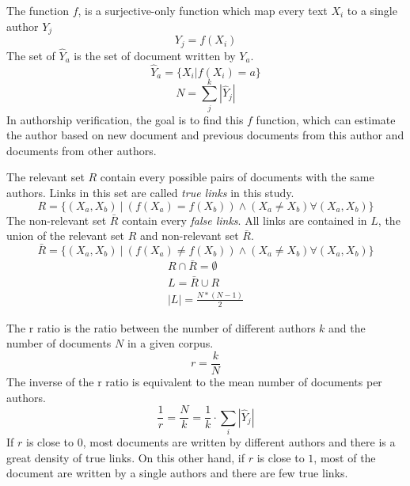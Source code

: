 \begin{definition}
  The function $f$, is a surjective-only function which map every text $X_i$ to a single author $Y_j$
  \begin{equation}
    Y_j = f(X_i)
  \end{equation}
  The set of $\hat{Y}_a$ is the set of document written by $Y_a$.
  \begin{equation}
    \hat{Y}_a = \{X_i | f(X_i) = a\}
  \end{equation}
  \begin{equation}
    N = \sum_{j}^k |\hat{Y}_j|
  \end{equation}
  In authorship verification, the goal is to find this $f$ function, which can estimate the author based on new document and previous documents from this author and documents from other authors.
\end{definition}

\begin{definition}
  The relevant set $R$ contain every possible pairs of documents with the same authors.
  Links in this set are called \textit{true links} in this study.
  \begin{equation}
    R = \{(X_a, X_b)\ |\ \left( f(X_a) = f(X_b) \right) \land \left(X_a \neq X_b \right) \forall (X_a, X_b)\}
  \end{equation}
  The non-relevant set $\bar{R}$ contain every \textit{false links}.
  All links are contained in $L$, the union of the relevant set $R$ and non-relevant set $\bar{R}$.
  \begin{equation}
    \bar{R} = \{(X_a, X_b)\ |\ \left( f(X_a) \neq f(X_b) \right) \land \left(X_a \neq X_b \right) \forall (X_a, X_b)\}
  \end{equation}
  \begin{gather}
    R \cap \bar{R} = \emptyset \\
    L = \bar{R} \cup R \\
    |L| = \frac{N * (N-1)}{2}
  \end{gather}
\end{definition}

\begin{definition}
  The r ratio is the ratio between the number of different authors $k$ and the number of documents $N$ in a given corpus.
  \begin{equation}
    r = \frac{k}{N}
  \end{equation}
  The inverse of the r ratio is equivalent to the mean number of documents per authors.
  \begin{equation}
    \frac{1}{r} = \frac{N}{k} = \frac{1}{k} \cdot \sum_{i} |\hat{Y}_j|
  \end{equation}
  If $r$ is close to $0$, most documents are written by different authors and there is a great density of true links.
  On this other hand, if $r$ is close to $1$, most of the document are written by a single authors and there are few true links.
\end{definition}

